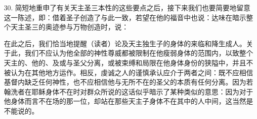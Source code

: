 30. 简短地重申了有关天主圣三本性的这些要点之后，接下来我们也要简要地留意这一陈述，即：借着圣子创造了与此一致，若望在他的福音中也说：达味在暗示整个天主圣三的奥迹参与万物创造时，说：\par

在此之后，我们恰当地提醒（读者）论及天主独生子的身体的来临和降生成人。关于此，我们不应认为他全部的神性尊威都被限制在他瘦弱身体的范围内，以致整个天主的、他的、及或与圣父分离，或被束缚和局限在他身体身份的狭隘中，并且不被认为在其他地方运作。相反，虔诚之人的谨慎承认应介于两者之间：既不应相信基督内缺乏任何神性，也不应相信他与无所不在的圣父的本质有任何分离。因为若翰洗者在耶稣身体不在时对群众所说的这话似乎暗示了某种类似的意思：因为对于他身体而言不在场的那一位，却站在那些天主子身体不在其中的人中间，这当然是不能说的。\par

